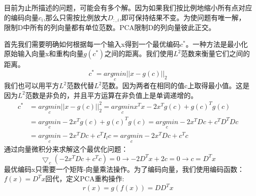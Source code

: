 \documentclass[openbib]{article}
\begin{document}
目前为止所描述的问题，可能会有多个解。因为如果我们按比例地缩小所有点对应的编码向量$c_i$,那么只需按比例放大$D_{:,i}$,即可保持结果不变。为使问题有唯一解，限制D中所有的列向量都有单位范数。PCA限制D的列向量彼此正交。

首先我们需要明确如何根据每一个输入x得到一个最优编码$c^*$。一种方法是最小化原始输入向量x和重构向量$g(c^*)$之间的距离。我们使用$L^2$范数来衡量它们之间的距离。
$$c^*=\underset{c}{argmin}||x-g(c)||_2$$
我们也可以用平方$L^2$范数代替$L^2$范数。因为两者在相同的值c上取得最小值。这是因为$L^2$范数是非负的，并且平方运算在非负值上是单调递增的。
\begin{equation*}
	\begin{split}
	c^*&=\underset{c}{argmin}||x-g(c)||^2_2=\underset{c}{argmin}x^Tx-2x^Tg(c)+g(c)^Tg(c)\\&=\underset{c}{argmin}-2x^Tg(c)+g(c)^Tg(c)=\underset{c}{argmin}-2x^TDc+c^TD^TDc\\&=\underset{c}{argmin}-2x^TDc+c^TI_lc=\underset{c}{argmin}-2x^TDc+c^Tc
	\end{split}
\end{equation*}
通过向量微积分来求解这个最优化问题：$$\bigtriangledown_c(-2x^TDc+c^Tc)=0\to -2D^Tx+2c=0\to c=D^Tx$$
最优编码x只需要一个矩阵-向量乘法操作。为了编码向量，我们使用编码函数：$f(x)=D^Tx$回代，定义PCA重构操作:
$$r(x)=g(f(x))=DD^Tx$$
\end{document}
